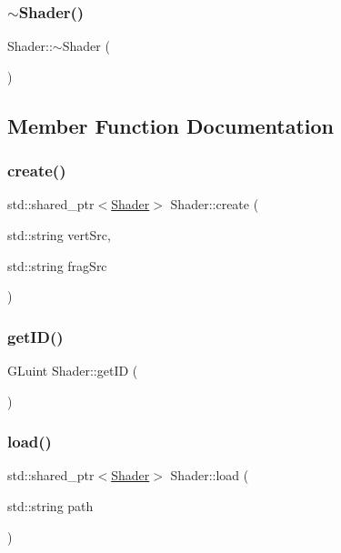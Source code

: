 \subsubsection{\texorpdfstring{$\sim$\+Shader()}{~Shader()}}
{\footnotesize\ttfamily Shader\+::$\sim$\+Shader (\begin{DoxyParamCaption}{ }\end{DoxyParamCaption})}



\subsection{Member Function Documentation}
\mbox{\label{class_shader_af67abb9216bbd4729181ed6cf8260baf}} 
\subsubsection{\texorpdfstring{create()}{create()}}
{\footnotesize\ttfamily std\+::shared\+\_\+ptr$<$\hyperlink{class_shader}{Shader}$>$ Shader\+::create (\begin{DoxyParamCaption}\item[{std\+::string}]{vert\+Src,  }\item[{std\+::string}]{frag\+Src }\end{DoxyParamCaption})\hspace{0.3cm}{\ttfamily [private]}}

\mbox{\label{class_shader_ad1bc9a16400499ec80c4f716a390abaf}} 
\subsubsection{\texorpdfstring{get\+I\+D()}{getID()}}
{\footnotesize\ttfamily G\+Luint Shader\+::get\+ID (\begin{DoxyParamCaption}{ }\end{DoxyParamCaption})}

\mbox{\label{class_shader_ab80e1350b80a6f6ccc3e28aca8ca3536}} 
\subsubsection{\texorpdfstring{load()}{load()}}
{\footnotesize\ttfamily std\+::shared\+\_\+ptr$<$\hyperlink{class_shader}{Shader}$>$ Shader\+::load (\begin{DoxyParamCaption}\item[{std\+::string}]{path }\end{DoxyParamCaption})\hspace{0.3cm}{\ttfamily [private]}}

